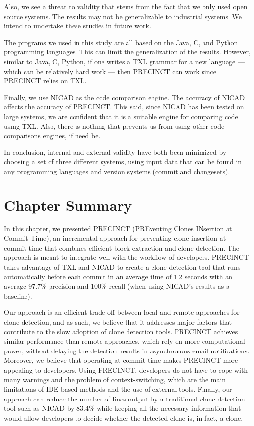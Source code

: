 \documentclass[12pt]{report}
\begin{document}
Also, we see a threat to validity that stems from the fact that we only
used open source systems. The results may not be generalizable to
industrial systems. We intend to undertake these studies in future work.

The programs we used in this study are all based on the Java, C, and
Python programming languages. This can limit the generalization of the
results. However, similar to Java, C, Python, if one writes a TXL
grammar for a new language --- which can be relatively hard work ---
then PRECINCT can work since PRECINCT relies on TXL.

Finally, we use NICAD as the code comparison engine. The accuracy of
NICAD affects the accuracy of PRECINCT. This said, since NICAD has been
tested on large systems, we are confident that it is a suitable engine
for comparing code using TXL. Also, there is nothing that prevents us
from using other code comparisons engines, if need be.

In conclusion, internal and external validity have both been minimized
by choosing a set of three different systems, using input data that can
be found in any programming languages and version systems (commit and
changesets).

\section{Chapter Summary}\label{chapter-summary-1}

In this chapter, we presented PRECINCT (PREventing Clones INsertion at
Commit-Time), an incremental approach for preventing clone insertion at
commit-time that combines efficient block extraction and clone
detection. The approach is meant to integrate well with the workflow of
developers. PRECINCT takes advantage of TXL and NICAD to create a clone
detection tool that runs automatically before each commit in an average
time of 1.2 seconds with an average 97.7\% precision and 100\% recall
(when using NICAD's results as a baseline).

Our approach is an efficient trade-off between local and remote
approaches for clone detection, and as such, we believe that it
addresses major factors that contribute to the slow adoption of clone
detection tools. PRECINCT achieves similar performance than remote
approaches, which rely on more computational power, without delaying the
detection results in asynchronous email notifications. Moreover, we
believe that operating at commit-time makes PRECINCT more appealing to
developers. Using PRECINCT, developers do not have to cope with many
warnings and the problem of context-switching, which are the main
limitations of IDE-based methods and the use of external tools. Finally,
our approach can reduce the number of lines output by a traditional
clone detection tool such as NICAD by 83.4\% while keeping all the
necessary information that would allow developers to decide whether the
detected clone is, in fact, a clone.
\end{document}
